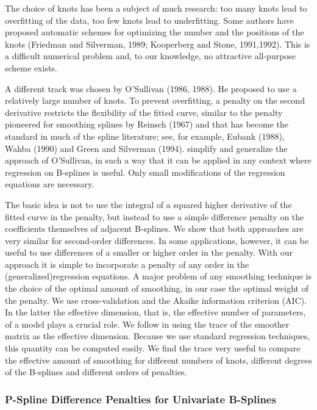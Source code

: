 \documentclass[12pt]{article}
\newcommand*\needsparaphrased{\color{red}}
\newcommand*\outlineskeleton{\color{green}}
\begin{document}
{ \needsparaphrased The choice of knots has been a subject of much research: too many knots lead to overfitting of the data, too few knots lead to underfitting. Some authors have proposed automatic schemes for optimizing the number and the positions of the knots (Friedman and Silverman, 1989; Kooperberg and Stone, 1991,1992). This is a difficult numerical problem and, to our knowledge, no attractive all-purpose scheme exists.}

{ \needsparaphrased A different track was chosen by O'Sullivan (1986, 1988). He proposed to use a relatively large number of knots. To prevent overfitting, a penalty on the second derivative restricts the flexibility of the fitted curve, similar to the penalty pioneered for smoothing splines by Reinsch (1967) and that has become the standard in much of the spline literature; see, for example, Eubank (1988), Wahba (1990) and Green and Silverman (1994). \cite{eilers1996flexible} simplify and generalize the approach of O'Sullivan, in such a way that it can be applied in any context where regression on B-splines is useful. Only small modifications of the regression equations are necessary.

The basic idea is not to use the integral of a squared higher derivative of the fitted curve in the penalty, but instead to use a simple difference penalty on the coefficients themselves of adjacent B-splines. We show that both approaches are very similar for second-order differences. In some applications, however, it can be useful to use differences of a smaller or higher order in the penalty. With our approach it is simple to incorporate a penalty of any order in the (generalized)regression equations. A major problem of any smoothing technique is the choice of the optimal amount of smoothing, in our case the optimal weight of the penalty. We use cross-validation and the Akaike information criterion (AIC). In the latter the effective dimension, that is, the effective number of parameters, of a model plays a crucial role. We follow \cite{buja1989linear} in using the trace of the smoother matrix as the effective dimension. Because we use standard regression techniques, this quantity can be computed easily. We find the trace very useful to compare the effective amount of smoothing for different numbers of knots, different degrees of the B-splines and different orders of penalties.}

\subsubsection{{\outlineskeleton P-Spline Difference Penalties for Univariate B-Splines}} \label{uni_pspline_penalties}
\end{document}
